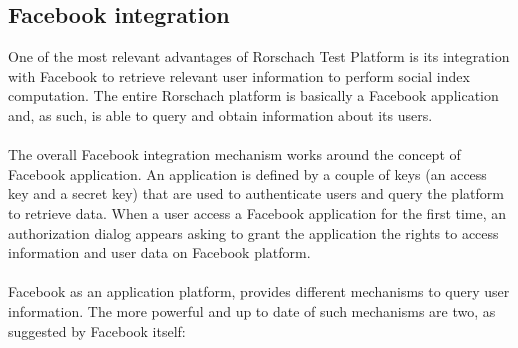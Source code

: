 \subsection{Facebook integration}
One of the most relevant advantages of Rorschach Test Platform is its integration with Facebook to retrieve relevant user information to perform social index computation.
The entire Rorschach platform is basically a Facebook application and, as such, is able to query and obtain information about its users.\\
\\
The overall Facebook integration mechanism works around the concept of Facebook application.
An application is defined by a couple of keys (an access key and a secret key) that are used to authenticate users and query the platform to retrieve data.
When a user access a Facebook application for the first time, an authorization dialog appears asking to grant the application the rights to access information and user
data on Facebook platform.\\
\\
Facebook as an application platform, provides different mechanisms to query user information.
The more powerful and up to date of such mechanisms are two, as suggested by Facebook itself:

